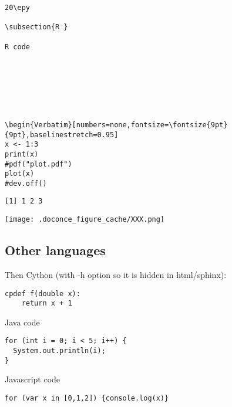 \documentclass[%
oneside,                 %
final,                   %
chapterprefix=true,      %
open=right,              %
10pt]{book}
\begin{document}
\begin{Verbatim}[numbers=none,fontsize=\fontsize{9pt}{9pt},baselinestretch=0.95]
20\epy

\subsection{R }

R code







\begin{Verbatim}[numbers=none,fontsize=\fontsize{9pt}{9pt},baselinestretch=0.95]
x <- 1:3
print(x)
#pdf("plot.pdf")
plot(x)
#dev.off()

\end{Verbatim}

\begin{Verbatim}[numbers=none,fontsize=\fontsize{9pt}{9pt},baselinestretch=0.95]
[1] 1 2 3
\end{Verbatim}
\begin{center}
   \texttt{[image: .doconce\_figure\_cache/XXX.png]}
\end{center}


\subsection{Other languages}

Then Cython (with -h option so it is hidden in html/sphinx):




\begin{Verbatim}[numbers=none,fontsize=\fontsize{9pt}{9pt},baselinestretch=0.95]
cpdef f(double x):
    return x + 1

\end{Verbatim}


Java code




\begin{Verbatim}[numbers=none,fontsize=\fontsize{9pt}{9pt},baselinestretch=0.95]
for (int i = 0; i < 5; i++) {
  System.out.println(i);
}

\end{Verbatim}


Javascript code


\begin{Verbatim}[numbers=none,fontsize=\fontsize{9pt}{9pt},baselinestretch=0.95]
for (var x in [0,1,2]) {console.log(x)}

\end{Verbatim}
\end{document}
